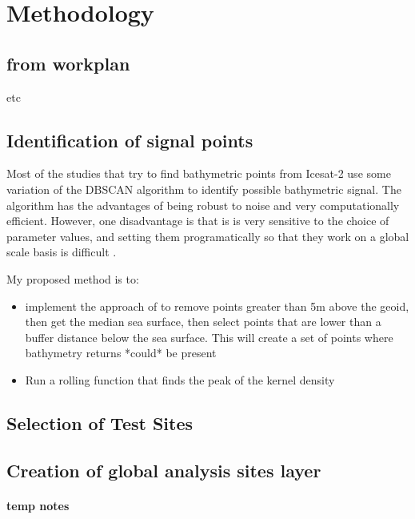 \chapter{Methodology}

\section*{from workplan}
etc

\section{Identification of signal points}
Most of the studies that try to find bathymetric points from Icesat-2 use some variation of the DBSCAN algorithm to identify possible bathymetric signal. The algorithm has the advantages of being robust to noise \cite{} and very computationally efficient. However, one disadvantage is that is is very sensitive to the choice of parameter values, and setting them programatically so that they work on a global scale basis is difficult \cite{}.

My proposed method is to:

\begin{itemize}
    \item implement the approach of \cite{Ranndal2021} to remove points greater than 5m above the geoid, then get the median sea surface, then select points that are lower than a buffer distance below the sea surface. This will create a set of points where bathymetry returns *could* be present
    \item Run a rolling function that finds the peak of the kernel density 
\end{itemize}

\section{Selection of Test Sites}
\section{Creation of global analysis sites layer}
\subsubsection*{temp notes}

